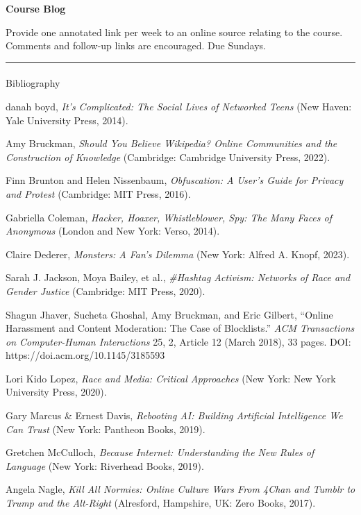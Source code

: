 \documentclass[
  letterpaper,
  DIV=11,
  numbers=noendperiod,
  oneside]{scrartcl}
\makeatletter
\let\oldparagraph\paragraph
\renewcommand{\paragraph}{
    \@ifstar
      \xxxParagraphStar
      \xxxParagraphNoStar
  }
\newcommand{\xxxParagraphStar}[1]{\oldparagraph*{#1}\mbox{}}
\newcommand{\xxxParagraphNoStar}[1]{\oldparagraph{#1}\mbox{}}
\makeatother
\begin{document}
\textbf{Course Blog}

Provide one annotated link per week to an online source relating to the
course. Comments and follow-up links are encouraged. Due Sundays.

\begin{center}\rule{0.5\linewidth}{0.5pt}\end{center}

\paragraph{Bibliography}\label{bibliography}

danah boyd, \emph{It's Complicated: The Social Lives of Networked Teens}
(New Haven: Yale University Press, 2014).

Amy Bruckman, \emph{Should You Believe Wikipedia? Online Communities and
the Construction of Knowledge} (Cambridge: Cambridge University Press,
2022).

Finn Brunton and Helen Nissenbaum, \emph{Obfuscation: A User's Guide for
Privacy and Protest} (Cambridge: MIT Press, 2016).

Gabriella Coleman, \emph{Hacker, Hoaxer, Whistleblower, Spy: The Many
Faces of Anonymous} (London and New York: Verso, 2014).

Claire Dederer, \emph{Monsters: A Fan's Dilemma} (New York: Alfred A.
Knopf, 2023).

Sarah J. Jackson, Moya Bailey, et al., \emph{\#Hashtag Activism:
Networks of Race and Gender Justice} (Cambridge: MIT Press, 2020).

Shagun Jhaver, Sucheta Ghoshal, Amy Bruckman, and Eric Gilbert, ``Online
Harassment and Content Moderation: The Case of Blocklists.'' \emph{ACM
Transactions on Computer-Human Interactions} 25, 2, Article 12 (March
2018), 33 pages. DOI: https://doi.acm.org/10.1145/3185593

Lori Kido Lopez, \emph{Race and Media: Critical Approaches} (New York:
New York University Press, 2020).

Gary Marcus \& Ernest Davis, \emph{Rebooting AI: Building Artificial
Intelligence We Can Trust} (New York: Pantheon Books, 2019).

Gretchen McCulloch, \emph{Because Internet: Understanding the New Rules
of Language} (New York: Riverhead Books, 2019).

Angela Nagle, \emph{Kill All Normies: Online Culture Wars From 4Chan and
Tumblr to Trump and the Alt-Right} (Alresford, Hampshire, UK: Zero
Books, 2017).
\end{document}

